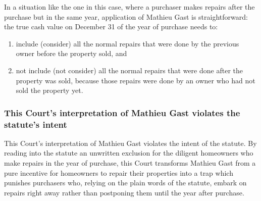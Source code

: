 \documentclass[12pt,\documentclassflag]{michiganCourtOfAppealsBrief}
\begin{document}
In a situation like the one in this case, where a purchaser makes repairs after the purchase but in the same year, application of Mathieu Gast is straightforward: the true cash value on December 31 of the year of purchase needs to:

\begin{enumerate}
  
\item include (consider) all the normal repairs that were done by the previous owner before the property sold, and 

\item  not include (not consider) all the normal repairs that were done after the property was sold, because those repairs were done by an owner who had not sold the property yet.
\end{enumerate}


\subsubsection{This Court's interpretation of Mathieu Gast violates the statute's intent}

This Court's interpretation of Mathieu Gast violates the intent of the statute.
By reading into the statute an unwritten exclusion for the diligent homeowners who make repairs in the year of purchase, this Court transforms Mathieu Gast from a pure incentive for homeowners to repair their properties into a trap which punishes purchasers who, relying on the plain words of the statute, embark on repairs right away rather than postponing them until the year after purchase.

\end{document}
